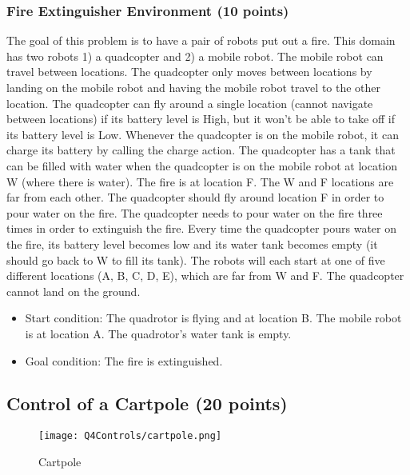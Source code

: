 \documentclass{article}
\newcommand{\?}{\stackrel{?}{=}}
\begin{document}
\subsubsection{Fire Extinguisher Environment (10 points)} The goal of this problem is to have a pair of robots put out a fire. This domain has two robots 1) a quadcopter and 2) a mobile robot. 
The mobile robot can travel between locations. 
The quadcopter only moves between locations by landing on the mobile robot and having the mobile robot travel to the other location. 
The quadcopter can fly around a single location (cannot navigate between locations) if its battery level is High, but it won’t be able to take off if its battery level is Low.
Whenever the quadcopter is on the mobile robot, it can charge its battery by calling the charge action. The quadcopter has a tank that can be filled with water when the quadcopter is on the mobile robot at location W (where there is water). The fire is at location F. The W and F locations are far from each other. 
The quadcopter should fly around location F in order to pour water on the fire. The quadcopter needs to pour water on the fire three times in order to extinguish the fire. 
Every time the quadcopter pours water on the fire, its battery level becomes low and its water tank becomes empty (it should go back to W to fill its tank). 
The robots will each start at one of five different locations (A, B, C, D, E), which are far from W and F. The quadcopter cannot land on the ground. 
\begin{itemize}
	\item Start condition: The quadrotor is flying and at location B. The mobile robot is at location A. The quadrotor's water tank is empty.
	\item Goal condition: The fire is extinguished.
\end{itemize}
%
%

\subsection{Control of a Cartpole (20 points)}
\begin{figure}[!h]
	\centering
	\texttt{[image: Q4Controls/cartpole.png]}
	\caption{Cartpole}
	\label{fig:cartpole}
\end{figure}
\end{document}

